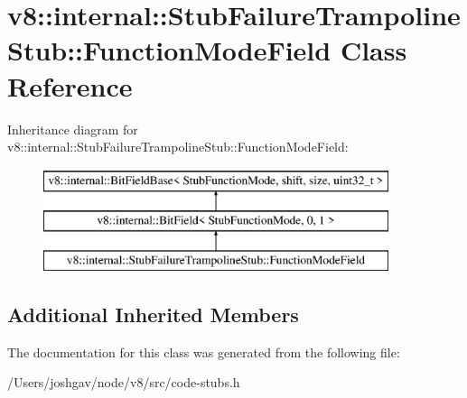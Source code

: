 \hypertarget{classv8_1_1internal_1_1_stub_failure_trampoline_stub_1_1_function_mode_field}{}\section{v8\+:\+:internal\+:\+:Stub\+Failure\+Trampoline\+Stub\+:\+:Function\+Mode\+Field Class Reference}
\label{classv8_1_1internal_1_1_stub_failure_trampoline_stub_1_1_function_mode_field}
Inheritance diagram for v8\+:\+:internal\+:\+:Stub\+Failure\+Trampoline\+Stub\+:\+:Function\+Mode\+Field\+:\begin{figure}[H]
\begin{center}
\leavevmode
\includegraphics[height=3.000000cm]{classv8_1_1internal_1_1_stub_failure_trampoline_stub_1_1_function_mode_field}
\end{center}
\end{figure}
\subsection*{Additional Inherited Members}


The documentation for this class was generated from the following file\+:\begin{DoxyCompactItemize}
\item 
/\+Users/joshgav/node/v8/src/code-\/stubs.\+h\end{DoxyCompactItemize}
